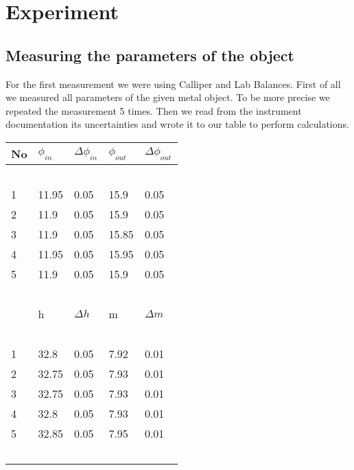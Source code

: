 \section{Experiment}

\subsection{Measuring the parameters of the object}

For the first measurement we were using Calliper and Lab Balances. First of all we measured all parameters of the given metal object. To be more precise we repeated the measurement 5 times. Then we read from the instrument documentation its uncertainties and wrote it to our table to perform calculations. 



\begin{table}[!ht]
    \centering
    \begin{tabular}{|l|l|l|l|l|}
    \hline
        No & $\phi_{in}$ &$\Delta{\phi_{in}}$ & $\phi_{out}$ & $\Delta{\phi_{out}}$   \\ \hline
        ~ & ~ & ~ & ~ & ~ \\ \hline
        1 & 11.95 & 0.05 & 15.9 & 0.05 \\ \hline
        2 & 11.9 & 0.05 & 15.9 & 0.05 \\ \hline
        3 & 11.9 & 0.05 & 15.85 & 0.05 \\ \hline
        4 & 11.95 & 0.05 & 15.95 & 0.05 \\ \hline
        5 & 11.9 & 0.05 & 15.9 & 0.05 \\ \hline
        ~ & ~ & ~ & ~ & ~ \\ \hline
        ~ & h & $\Delta{h}$ & m  & $\Delta{m}$  \\ \hline
        ~ & ~ & ~ & ~ & ~ \\ \hline
        1 & 32.8 & 0.05 & 7.92 & 0.01 \\ \hline
        2 & 32.75 & 0.05 & 7.93 & 0.01 \\ \hline
        3 & 32.75 & 0.05 & 7.93 & 0.01 \\ \hline
        4 & 32.8 & 0.05 & 7.93 & 0.01 \\ \hline
        5 & 32.85 & 0.05 & 7.95 & 0.01 \\ \hline
        ~ & ~ & ~ & ~ & ~ \\ \hline
        

\end{tabular}
\end{table}
